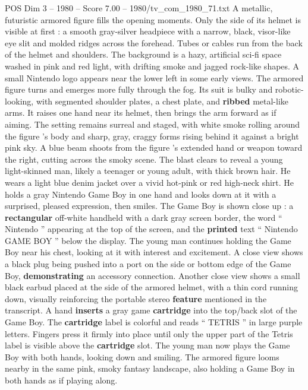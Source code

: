 \begin{textsample}{POS Dim 3 – 1980 – Score 7.00 – 1980/tv\_com\_1980\_71.txt}  \label{ex:f3_pos_048}
A metallic, futuristic armored figure fills the opening moments.
Only the side of its helmet is visible at first : a smooth gray-silver headpiece with a narrow, black, visor-like eye slit and molded ridges across the forehead.
Tubes or cables run from the back of the helmet and shoulders.
The background is a hazy, artificial sci-fi space washed in pink and red light, with drifting smoke and jagged rock-like shapes.
A small Nintendo logo appears near the lower left in some early views.
The armored figure turns and emerges more fully through the fog.
Its suit is bulky and robotic-looking, with segmented shoulder plates, a chest plate, and \textbf{ribbed} metal-like arms.
It raises one hand near its helmet, then brings the arm forward as if aiming.
The setting remains surreal and staged, with white smoke rolling around the figure ’s body and sharp, gray, craggy forms rising behind it against a bright pink sky.
A blue beam shoots from the figure ’s extended hand or weapon toward the right, cutting across the smoky scene.
The blast clears to reveal a young light-skinned man, likely a teenager or young adult, with thick brown hair.
He wears a light blue denim jacket over a vivid hot-pink or red high-neck shirt.
He holds a gray Nintendo Game Boy in one hand and looks down at it with a surprised, pleased expression, then smiles.
The Game Boy is shown close up : a \textbf{rectangular} off-white handheld with a dark gray screen border, the word “ Nintendo ” appearing at the top of the screen, and the \textbf{printed} text “ Nintendo GAME BOY ” below the display.
The young man continues holding the Game Boy near his chest, looking at it with interest and excitement.
A close view shows a black plug being pushed into a port on the side or bottom edge of the Game Boy, \textbf{demonstrating} an accessory connection.
Another close view shows a small black earbud placed at the side of the armored helmet, with a thin cord running down, visually reinforcing the portable stereo \textbf{feature} mentioned in the transcript.
A hand \textbf{inserts} a gray game \textbf{cartridge} into the top/back slot of the Game Boy.
The \textbf{cartridge} label is colorful and reads “ TETRIS ” in large purple letters.
Fingers press it firmly into place until only the upper part of the Tetris label is visible above the \textbf{cartridge} slot.
The young man now plays the Game Boy with both hands, looking down and smiling.
The armored figure looms nearby in the same pink, smoky fantasy landscape, also holding a Game Boy in both hands as if playing along.

\end{textsample}
